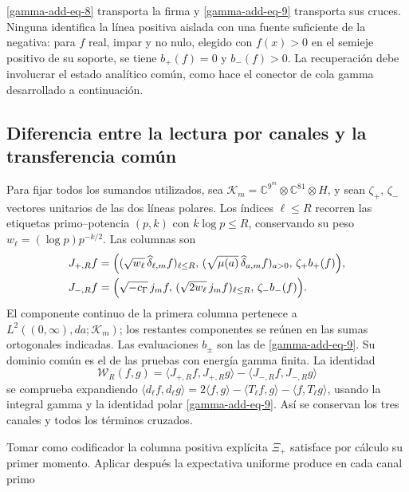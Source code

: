 \eqref{gamma-add-eq-8} transporta la firma y \eqref{gamma-add-eq-9} transporta sus cruces. Ninguna identifica la línea positiva aislada con una fuente suficiente de la negativa: para \(f\) real, impar y no nulo, elegido con \(f(x)>0\) en el semieje positivo de su soporte, se tiene \(b_+(f)=0\) y \(b_-(f)>0\). La recuperación debe involucrar el estado analítico común, como hace el conector de cola gamma desarrollado a continuación.

\subsection{Diferencia entre la lectura por canales y la transferencia común}
\label{gamma-add-sub-259}

Para fijar todos los sumandos utilizados, sea
\(\mathcal K_m=\mathbb C^{9^m}\otimes\mathbb C^{81}\otimes H\),
y sean \(\zeta_+\), \(\zeta_-\) vectores unitarios de las dos
líneas polares. Los índices \(\ell\leq R\) recorren las etiquetas
primo--potencia \((p,k)\) con \(k\log p\leq R\), conservando
su peso \(w_\ell=(\log p)p^{-k/2}\). Las columnas son
\begin{equation}
\begin{aligned}
J_{+,R}f={}&\Bigl(
 (\sqrt{w_\ell}\,\widehat\delta_{\ell,m}f)_{\ell\leq R},\,
 (\sqrt{\mu(a)}\,\widehat\delta_{a,m}f)_{a>0},\,
 \zeta_+b_+(f)\Bigr),\\
J_{-,R}f={}&\Bigl(
 \sqrt{-c_\Gamma}\,j_mf,\,
 (\sqrt{2w_\ell}\,j_mf)_{\ell\leq R},\,
 \zeta_-b_-(f)\Bigr).
\end{aligned}
\label{gamma-add-columnas-completas}
\end{equation}
El componente continuo de la primera columna pertenece a
\(L^2((0,\infty),da;\mathcal K_m)\); los restantes componentes
se reúnen en las sumas ortogonales indicadas. Las evaluaciones
\(b_\pm\) son las de \eqref{gamma-add-eq-9}. Su dominio común
es el de las pruebas con energía gamma finita. La identidad
\begin{equation}
\mathscr W_R(f,g)
=\langle J_{+,R}f,J_{+,R}g\rangle
 -\langle J_{-,R}f,J_{-,R}g\rangle
\label{gamma-add-diferencia-columnas}
\end{equation}
se comprueba expandiendo
\(\langle d_\ell f,d_\ell g\rangle
=2\langle f,g\rangle-\langle T_\ell f,g\rangle
-\langle f,T_\ell g\rangle\), usando la integral gamma
y la identidad polar \eqref{gamma-add-eq-9}. Así se conservan
los tres canales y todos los términos cruzados.

Tomar como codificador la columna positiva explícita \(\Xi_+\) satisface por cálculo su primer momento. Aplicar después la expectativa uniforme produce en cada canal primo

